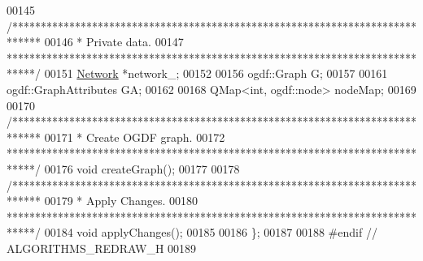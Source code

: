 \begin{DoxyCode}
00145   \textcolor{comment}{/*****************************************************************************}
00146 \textcolor{comment}{  * Private data.}
00147 \textcolor{comment}{  *****************************************************************************/}
00151   \hyperlink{class_network}{Network} *network\_;
00152 
00156   ogdf::Graph G;
00157 
00161   ogdf::GraphAttributes GA;
00162 
00168   QMap<int, ogdf::node> nodeMap;
00169 
00170   \textcolor{comment}{/*****************************************************************************}
00171 \textcolor{comment}{  * Create OGDF graph.}
00172 \textcolor{comment}{  *****************************************************************************/}
00176   \textcolor{keywordtype}{void} createGraph();
00177 
00178   \textcolor{comment}{/*****************************************************************************}
00179 \textcolor{comment}{  * Apply Changes.}
00180 \textcolor{comment}{  *****************************************************************************/}
00184   \textcolor{keywordtype}{void} applyChanges();
00185 
00186 \};
00187 
00188 \textcolor{preprocessor}{#endif // ALGORITHMS\_REDRAW\_H}
00189 
\end{DoxyCode}
